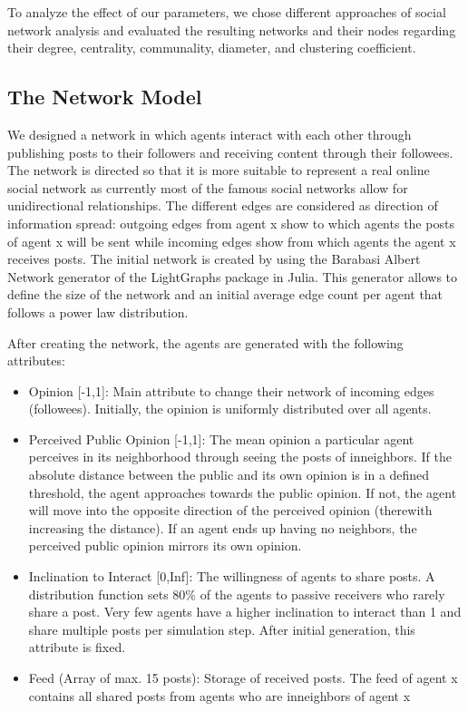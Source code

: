 \documentclass[runningheads]{llncs}
\providecommand{\tightlist}{%
  \setlength{\itemsep}{0pt}\setlength{\parskip}{0pt}}
\begin{document}
To analyze the effect of our parameters, we chose different approaches
of social network analysis and evaluated the resulting networks and
their nodes regarding their degree, centrality, communality, diameter,
and clustering coefficient.

\hypertarget{the-network-model}{%
\subsection{The Network Model}\label{the-network-model}}

We designed a network in which agents interact with each other through
publishing posts to their followers and receiving content through their
followees. The network is directed so that it is more suitable to
represent a real online social network as currently most of the famous
social networks allow for unidirectional relationships. The different
edges are considered as direction of information spread: outgoing edges
from agent x show to which agents the posts of agent x will be sent
while incoming edges show from which agents the agent x receives posts.
The initial network is created by using the Barabasi Albert Network
generator of the LightGraphs package in Julia. This generator allows to
define the size of the network and an initial average edge count per
agent that follows a power law distribution.

After creating the network, the agents are generated with the following
attributes:

\begin{itemize}
\tightlist
\item
  Opinion {[}-1,1{]}: Main attribute to change their network of incoming
  edges (followees). Initially, the opinion is uniformly distributed
  over all agents.
\item
  Perceived Public Opinion {[}-1,1{]}: The mean opinion a particular
  agent perceives in its neighborhood through seeing the posts of
  inneighbors. If the absolute distance between the public and its own
  opinion is in a defined threshold, the agent approaches towards the
  public opinion. If not, the agent will move into the opposite
  direction of the perceived opinion (therewith increasing the
  distance). If an agent ends up having no neighbors, the perceived
  public opinion mirrors its own opinion.
\item
  Inclination to Interact {[}0,Inf{]}: The willingness of agents to
  share posts. A distribution function sets 80\% of the agents to
  passive receivers who rarely share a post. Very few agents have a
  higher inclination to interact than 1 and share multiple posts per
  simulation step. After initial generation, this attribute is fixed.
\item
  Feed (Array of max. 15 posts): Storage of received posts. The feed of
  agent x contains all shared posts from agents who are inneighbors of
  agent x
\end{itemize}
\end{document}
